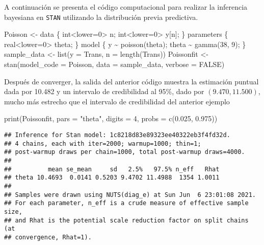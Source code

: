 \documentclass[
  10pt,
  spanish,
]{book}
\newenvironment{Shaded}{\begin{snugshade}}{\end{snugshade}}
\newcommand{\AttributeTok}[1]{\textcolor[rgb]{0.77,0.63,0.00}{#1}}
\newcommand{\ConstantTok}[1]{\textcolor[rgb]{0.00,0.00,0.00}{#1}}
\newcommand{\DecValTok}[1]{\textcolor[rgb]{0.00,0.00,0.81}{#1}}
\newcommand{\FloatTok}[1]{\textcolor[rgb]{0.00,0.00,0.81}{#1}}
\newcommand{\FunctionTok}[1]{\textcolor[rgb]{0.00,0.00,0.00}{#1}}
\newcommand{\NormalTok}[1]{#1}
\newcommand{\OtherTok}[1]{\textcolor[rgb]{0.56,0.35,0.01}{#1}}
\newcommand{\StringTok}[1]{\textcolor[rgb]{0.31,0.60,0.02}{#1}}
\theoremstyle{definition}
\theoremstyle{definition}
\theoremstyle{definition}
\theoremstyle{definition}
\theoremstyle{remark}
\begin{document}
A continuación se presenta el código computacional para realizar la inferencia bayesiana en \texttt{STAN} utilizando la distribución previa predictiva.

\begin{Shaded}
\begin{Highlighting}[]
\NormalTok{Poisson }\OtherTok{\textless{}{-}} \StringTok{\textquotesingle{}}
\StringTok{data \{}
\StringTok{  int\textless{}lower=0\textgreater{} n;}
\StringTok{  int\textless{}lower=0\textgreater{} y[n];}
\StringTok{\}}
\StringTok{parameters \{}
\StringTok{  real\textless{}lower=0\textgreater{} theta;}
\StringTok{\}}
\StringTok{model \{}
\StringTok{  y \textasciitilde{} poisson(theta);}
\StringTok{  theta \textasciitilde{} gamma(38, 9);}
\StringTok{\}}
\StringTok{\textquotesingle{}}
\NormalTok{sample\_data }\OtherTok{\textless{}{-}} \FunctionTok{list}\NormalTok{(}\AttributeTok{y =}\NormalTok{ Trans, }\AttributeTok{n =} \FunctionTok{length}\NormalTok{(Trans))}
\NormalTok{Poissonfit }\OtherTok{\textless{}{-}} \FunctionTok{stan}\NormalTok{(}\AttributeTok{model\_code =}\NormalTok{ Poisson,}
               \AttributeTok{data =}\NormalTok{ sample\_data, }\AttributeTok{verbose =} \ConstantTok{FALSE}\NormalTok{)}
\end{Highlighting}
\end{Shaded}

Después de converger, la salida del anterior código muestra la estimación puntual dada por 10.482 y un intervalo de credibilidad al 95\%, dado por \((9.470, 11.500)\), mucho más estrecho que el intervalo de credibilidad del anterior ejemplo

\begin{Shaded}
\begin{Highlighting}[]
\FunctionTok{print}\NormalTok{(Poissonfit, }\AttributeTok{pars =} \StringTok{"theta"}\NormalTok{, }
      \AttributeTok{digits =} \DecValTok{4}\NormalTok{, }\AttributeTok{probs =} \FunctionTok{c}\NormalTok{(}\FloatTok{0.025}\NormalTok{, }\FloatTok{0.975}\NormalTok{))}
\end{Highlighting}
\end{Shaded}

\begin{verbatim}
## Inference for Stan model: 1c8218d83e89323ee40322eb3f4fd32d.
## 4 chains, each with iter=2000; warmup=1000; thin=1; 
## post-warmup draws per chain=1000, total post-warmup draws=4000.
## 
##          mean se_mean     sd   2.5%   97.5% n_eff   Rhat
## theta 10.4693  0.0141 0.5203 9.4702 11.4988  1354 1.0011
## 
## Samples were drawn using NUTS(diag_e) at Sun Jun  6 23:01:08 2021.
## For each parameter, n_eff is a crude measure of effective sample size,
## and Rhat is the potential scale reduction factor on split chains (at 
## convergence, Rhat=1).
\end{verbatim}
\end{document}
